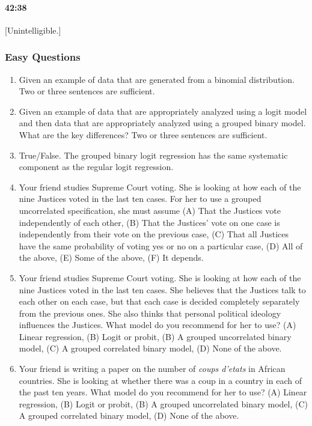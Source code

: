 \documentclass[11pt]{article}
\begin{document}
\paragraph{42:38} [Unintelligible.]

\subsubsection{Easy Questions}

\begin{enumerate}
\item Given an example of data that are generated from a binomial distribution. Two or three sentences are sufficient.
\item Given an example of data that are appropriately analyzed using a logit model and then data that are appropriately analyzed using a grouped binary model.  What are the key differences?  Two or three sentences are sufficient.
\item True/False.  The grouped binary logit regression has the same systematic component as the regular logit regression.
\item Your friend studies Supreme Court voting. She is looking at how each of the nine Justices voted in the last ten cases.  For her to use a grouped uncorrelated specification, she must assume (A) That the Justices vote independently of each other, (B) That the Justices' vote on one case is independently from their vote on the previous case, (C) That all Justices have the same probability of voting yes or no on a particular case, (D) All of the above, (E) Some of the above, (F) It depends.
\item Your friend studies Supreme Court voting. She is looking at how each of the nine Justices voted in the last ten cases.  She believes that the Justices talk to each other on each case, but that each case is decided completely separately from the previous ones.  She also thinks that personal political ideology influences the Justices.  What model do you recommend for her to use? (A) Linear regression, (B) Logit or probit, (B) A grouped uncorrelated binary model, (C) A grouped correlated binary model, (D) None of the above.
\item Your friend is writing a paper on the number of \textit{coups d'etats} in African countries.  She is looking at whether there was a coup in a country in each of the past ten years.  What model do you recommend for her to use? (A) Linear regression, (B) Logit or probit, (B) A grouped uncorrelated binary model, (C) A grouped correlated binary model, (D) None of the above.

\end{enumerate}
\end{document}
